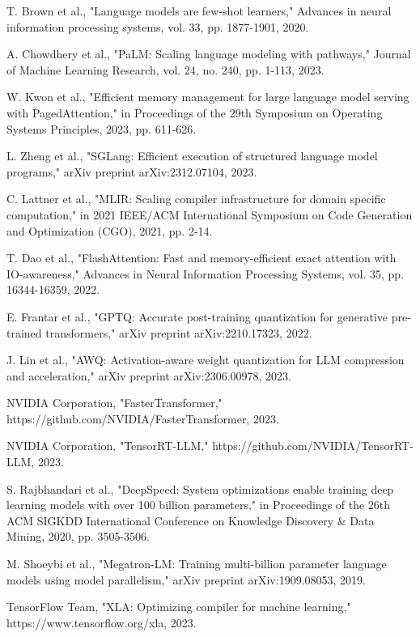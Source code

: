 \documentclass[conference]{IEEEtran}
\begin{document}
\begin{thebibliography}{00}
 T. Brown et al., "Language models are few-shot learners," Advances in neural information processing systems, vol. 33, pp. 1877-1901, 2020.

 A. Chowdhery et al., "PaLM: Scaling language modeling with pathways," Journal of Machine Learning Research, vol. 24, no. 240, pp. 1-113, 2023.

 W. Kwon et al., "Efficient memory management for large language model serving with PagedAttention," in Proceedings of the 29th Symposium on Operating Systems Principles, 2023, pp. 611-626.

 L. Zheng et al., "SGLang: Efficient execution of structured language model programs," arXiv preprint arXiv:2312.07104, 2023.

 C. Lattner et al., "MLIR: Scaling compiler infrastructure for domain specific computation," in 2021 IEEE/ACM International Symposium on Code Generation and Optimization (CGO), 2021, pp. 2-14.

 T. Dao et al., "FlashAttention: Fast and memory-efficient exact attention with IO-awareness," Advances in Neural Information Processing Systems, vol. 35, pp. 16344-16359, 2022.

 E. Frantar et al., "GPTQ: Accurate post-training quantization for generative pre-trained transformers," arXiv preprint arXiv:2210.17323, 2022.

 J. Lin et al., "AWQ: Activation-aware weight quantization for LLM compression and acceleration," arXiv preprint arXiv:2306.00978, 2023.

 NVIDIA Corporation, "FasterTransformer," https://github.com/NVIDIA/FasterTransformer, 2023.

 NVIDIA Corporation, "TensorRT-LLM," https://github.com/NVIDIA/TensorRT-LLM, 2023.

 S. Rajbhandari et al., "DeepSpeed: System optimizations enable training deep learning models with over 100 billion parameters," in Proceedings of the 26th ACM SIGKDD International Conference on Knowledge Discovery \& Data Mining, 2020, pp. 3505-3506.

 M. Shoeybi et al., "Megatron-LM: Training multi-billion parameter language models using model parallelism," arXiv preprint arXiv:1909.08053, 2019.

 TensorFlow Team, "XLA: Optimizing compiler for machine learning," https://www.tensorflow.org/xla, 2023.


\end{thebibliography}
\end{document}
